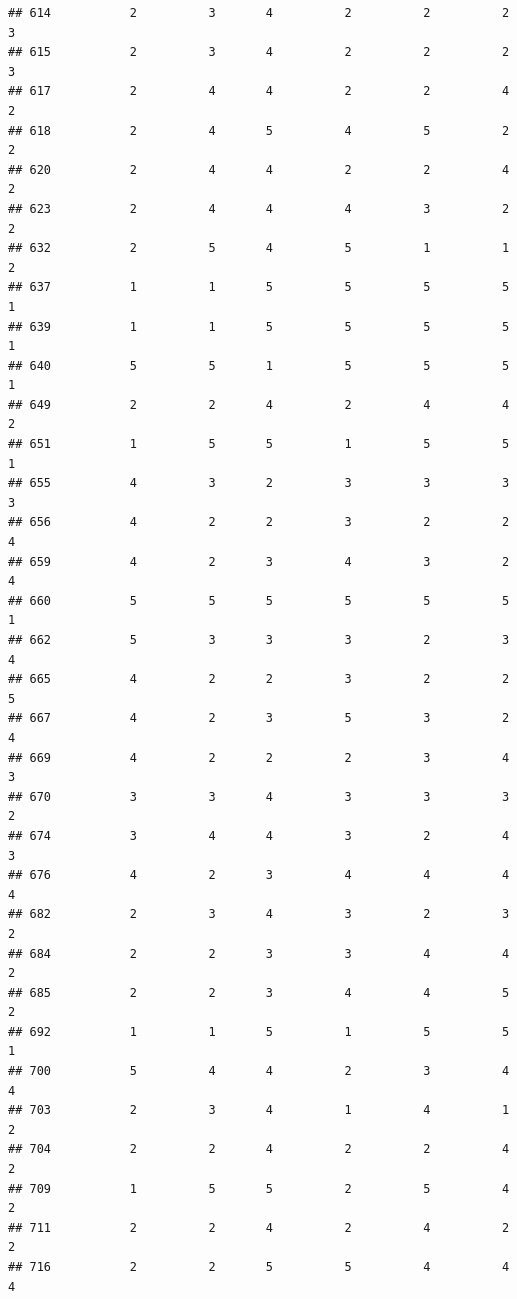 \documentclass[
]{article}
\begin{document}
\begin{verbatim}
## 614           2          3       4          2          2          2        3
## 615           2          3       4          2          2          2        3
## 617           2          4       4          2          2          4        2
## 618           2          4       5          4          5          2        2
## 620           2          4       4          2          2          4        2
## 623           2          4       4          4          3          2        2
## 632           2          5       4          5          1          1        2
## 637           1          1       5          5          5          5        1
## 639           1          1       5          5          5          5        1
## 640           5          5       1          5          5          5        1
## 649           2          2       4          2          4          4        2
## 651           1          5       5          1          5          5        1
## 655           4          3       2          3          3          3        3
## 656           4          2       2          3          2          2        4
## 659           4          2       3          4          3          2        4
## 660           5          5       5          5          5          5        1
## 662           5          3       3          3          2          3        4
## 665           4          2       2          3          2          2        5
## 667           4          2       3          5          3          2        4
## 669           4          2       2          2          3          4        3
## 670           3          3       4          3          3          3        2
## 674           3          4       4          3          2          4        3
## 676           4          2       3          4          4          4        4
## 682           2          3       4          3          2          3        2
## 684           2          2       3          3          4          4        2
## 685           2          2       3          4          4          5        2
## 692           1          1       5          1          5          5        1
## 700           5          4       4          2          3          4        4
## 703           2          3       4          1          4          1        2
## 704           2          2       4          2          2          4        2
## 709           1          5       5          2          5          4        2
## 711           2          2       4          2          4          2        2
## 716           2          2       5          5          4          4        4

\end{verbatim}
\end{document}
